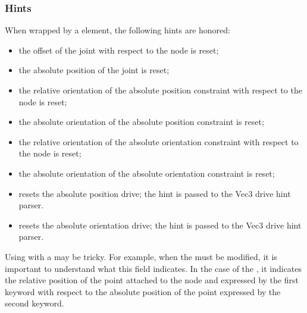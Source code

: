 \subsubsection{Hints}
When wrapped by a  element, the following hints are honored:
\begin{itemize}
\item {} the offset of the joint
with respect to the node is reset;
\item {} the absolute position of the joint
is reset;
\item {} the relative orientation
of the absolute position constraint with respect to the node is reset;
\item {} the absolute orientation 
of the absolute position constraint is reset;
\item {} the relative orientation
of the absolute orientation constraint with respect to the node is reset;
\item {} the absolute orientation 
of the absolute orientation constraint is reset;
\item {} resets the absolute position drive;
the hint is passed to the Vec3 drive hint parser.
\item {} resets the absolute orientation drive;
the hint is passed to the Vec3 drive hint parser.
\end{itemize}
Using  with a  may be tricky.
For example, when the  must be modified,
it is important to understand what this field indicates.
In the case of the , it indicates
the relative position of the point attached to the node and expressed by the first  keyword
with respect to the absolute position of the point expressed by the second  keyword.

